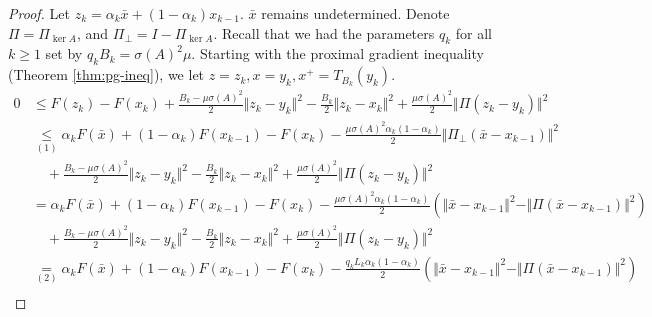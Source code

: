 \documentclass[12pt]{article}
\begin{document}
        \begin{proof}
            Let $z_k = \alpha_k \bar x + (1 - \alpha_k)x_{k - 1}$. 
            $\bar x$ remains undetermined. 
            Denote $\Pi = \Pi_{\ker A}$, and $\Pi_{\perp} = I - \Pi_{\ker A}$. 
            Recall that we had the parameters $q_k$ for all $k \ge 1$ set by $q_kB_k = \sigma(A)^2\mu$. 
            Starting with the proximal gradient inequality (Theorem \ref{thm:pg-ineq}), we let $z = z_k, x = y_k, x^+ = T_{B_k}(y_k)$. 
            {\allowdisplaybreaks
                \begin{align*}
                    0 &\le 
                    F(z_k) - F(x_k) 
                    + \frac{B_k - \mu\sigma(A)^2}{2}\Vert z_k - y_k\Vert^2 
                    - \frac{B_k}{2}\Vert z_k - x_k\Vert^2 
                    + \frac{\mu\sigma(A)^2}{2}\Vert \Pi(z_k - y_k)\Vert^2
                    \\
                    &\underset{(1)}{\le} 
                    \alpha_k F(\bar x) + (1 - \alpha_k)F(x_{k - 1}) - F(x_k)
                    - \frac{\mu\sigma(A)^2\alpha_k(1 - \alpha_k)}{2}\Vert \Pi_{\perp}(\bar x - x_{k - 1})\Vert^2
                        \\&\quad
                        + \frac{B_k - \mu\sigma(A)^2}{2}\Vert z_k - y_k\Vert^2 
                        - \frac{B_k}{2}\Vert z_k - x_k\Vert^2 
                        + \frac{\mu\sigma(A)^2}{2}\Vert \Pi(z_k - y_k)\Vert^2
                    \\
                    &= 
                    \alpha_k F(\bar x) + (1 - \alpha_k)F(x_{k - 1}) - F(x_k)
                    - \frac{\mu\sigma(A)^2\alpha_k(1 - \alpha_k)}{2}
                        \left(
                            \Vert \bar x - x_{k - 1}\Vert^2 - \Vert \Pi(\bar x - x_{k - 1})\Vert^2
                        \right)
                        \\&\quad
                        + \frac{B_k - \mu\sigma(A)^2}{2}\Vert z_k - y_k\Vert^2 
                        - \frac{B_k}{2}\Vert z_k - x_k\Vert^2 
                        + \frac{\mu\sigma(A)^2}{2}\Vert \Pi(z_k - y_k)\Vert^2
                    \\
                    &\underset{(2)}{=}
                    \alpha_k F(\bar x) + (1 - \alpha_k)F(x_{k - 1}) - F(x_k)
                    - \frac{q_kL_k\alpha_k(1 - \alpha_k)}{2}
                        \left(
                            \Vert \bar x - x_{k - 1}\Vert^2 - \Vert \Pi(\bar x - x_{k - 1})\Vert^2
                        \right)
                        \\&\quad

\end{align*}}
\end{proof}
\end{document}
